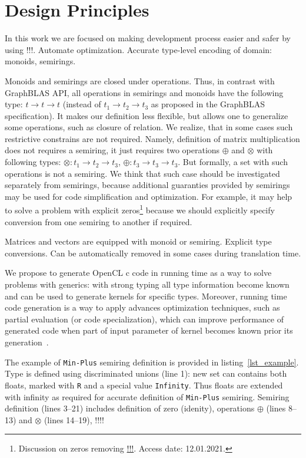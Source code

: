 \section{Design Principles}

In this work we are focused on making development process easier and safer by using !!!. 
Automate optimization.
Accurate type-level encoding of domain: monoids, semirings.

Monoids and semirings are closed under operations. 
Thus, in contrast with GraphBLAS API, all operations in semirings and monoids have the following type: $t \to t \to t$ (instead of $t_1 \to t_2 \to t_3$ as proposed in the GraphBLAS specification).  
It makes our definition less flexible, but allows one to generalize some operations, such as closure of relation.
We realize, that in some cases such restrictive constrains are not required.
Namely, definition of matrix multiplication does not requires a semiring, it just requires two operations $\oplus$ and $\otimes$ with following types: $\otimes: t_1 \to t_2 \to t_3$, $\oplus: t_3 \to t_3 \to t_3 $. 
But formally, a set with such operations is not a semiring.
We think that such case should be investigated separately from semirings, because additional guaranties provided by semirings may be used for code simplification and optimization.
For example, it may help to solve a problem with explicit zeros\footnote{Discussion on zeros removing \url{!!!}. Access date: 12.01.2021. } because we should explicitly specify conversion from one semiring to another if required.  

Matrices and vectors are equipped with monoid or semiring.
Explicit type conversions. 
Can be automatically removed in some cases during translation time.

We propose to generate OpenCL c code in running time as a way to solve problems with generics: with strong typing all type information become known and can be used to generate kernels for specific types.
Moreover, running time code generation is a way to apply advances optimization techniques, such as partial evaluation (or code specialization), which can improve performance of generated code when part of input parameter of kernel becomes known prior its generation~\cite{10.1145/3332466.3374507}.

The example of \texttt{Min-Plus} semiring definition is provided in listing~\ref{lst_example}.
Type is defined using discriminated unions (line 1): new set can contains both floats, marked with  \texttt{R} and a special value \texttt{Infinity}.
Thus floats are extended with infinity as required for accurate definition of \texttt{Min-Plus} semiring.
Semiring definition (lines 3--21) includes definition of zero (idenity), operations $\oplus$ (lines 8--13) and $\otimes$ (lines 14--19), !!!!


